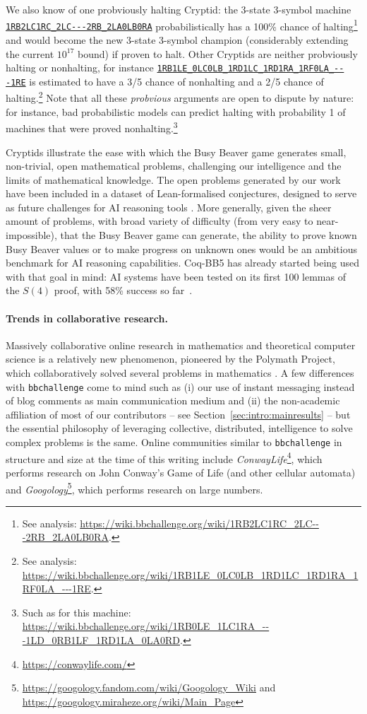 \documentclass[a4paper,british]{article}
\theoremstyle{definition} %
\numberwithin{equation}{section}
\theoremstyle{definition} %
\newcommand{\tm}[1]{\href{https://bbchallenge.org/#1}{\texttt{\nolinkurl{#1}}}}
\newcommand{\CoqBB}{Coq-BB5\xspace}
\begin{document}
We also know of one probviously halting Cryptid: the 3-state 3-symbol machine \tm{1RB2LC1RC_2LC---2RB_2LA0LB0RA} probabilistically has a 100\% chance of halting\footnote{See analysis: {\scriptsize \url{https://wiki.bbchallenge.org/wiki/1RB2LC1RC_2LC---2RB_2LA0LB0RA}}.} and would become the new 3-state 3-symbol champion (considerably extending the current $10^{17}$ bound) if proven to halt. Other Cryptids are neither probviously halting or nonhalting, for instance \tm{1RB1LE_0LC0LB_1RD1LC_1RD1RA_1RF0LA_---1RE} is estimated to have a 3/5 chance of nonhalting and a 2/5 chance of halting.\footnote{See analysis: {\scriptsize \url{https://wiki.bbchallenge.org/wiki/1RB1LE_0LC0LB_1RD1LC_1RD1RA_1RF0LA_---1RE}}.} Note that all these \textit{probvious} arguments are open to dispute by nature: for instance, bad probabilistic models can predict halting with probability 1 of machines that were proved nonhalting.\footnote{Such as for this machine: \url{https://wiki.bbchallenge.org/wiki/1RB0LE_1LC1RA_---1LD_0RB1LF_1RD1LA_0LA0RD}.}

Cryptids illustrate the ease with which the Busy Beaver game generates small, non-trivial, open mathematical problems, challenging our intelligence and the limits of mathematical knowledge. The open problems generated by our work have been included in a dataset of Lean-formalised conjectures, designed to serve as future challenges for AI reasoning tools \cite{google-deepmind-formal-conjectures}. More generally, given the sheer amount of problems, with broad variety of difficulty (from very easy to near-impossible), that the Busy Beaver game can generate, the ability to prove known Busy Beaver values or to make progress on unknown ones would be an ambitious benchmark for AI reasoning capabilities. \CoqBB has already started being used with that goal in mind: AI systems have been tested on its first 100 lemmas of the $S(4)$ proof, with 58\% success so far~\cite{teodorescu2024nlir}.

\paragraph{Trends in collaborative research.} Massively collaborative online research in mathematics and theoretical computer science is a relatively new phenomenon, pioneered by the Polymath Project, which collaboratively solved several problems in mathematics \cite{Gowers2009}. A few differences with \texttt{bbchallenge} come to mind such as (i) our use of instant messaging instead of blog comments as main communication medium and (ii) the non-academic affiliation of most of our contributors -- see Section~\ref{sec:intro:mainresults} -- but the essential philosophy of leveraging collective, distributed, intelligence to solve complex problems is the same. Online communities similar to \texttt{bbchallenge} in structure and size at the time of this writing include \textit{ConwayLife}\footnote{\url{https://conwaylife.com/}}, which performs research on John Conway's Game of Life (and other cellular automata) and \textit{Googology}\footnote{\url{https://googology.fandom.com/wiki/Googology_Wiki} and \url{https://googology.miraheze.org/wiki/Main_Page}}, which performs research on large numbers.
\end{document}
